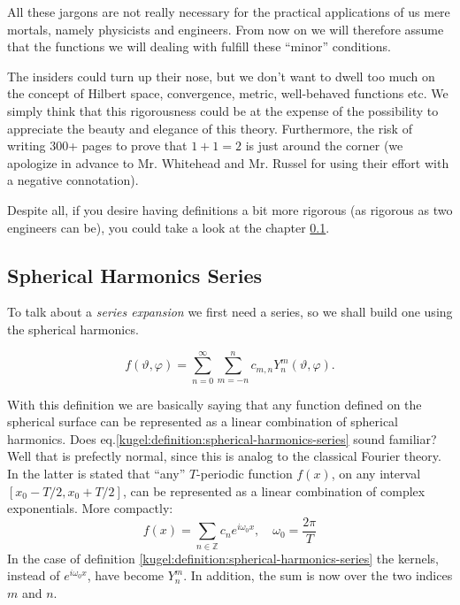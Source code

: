 All these jargons are not really necessary for the practical applications of us mere mortals, namely physicists and engineers. 
From now on we will therefore assume that the functions we will dealing with fulfill these ``minor'' conditions.

The insiders could turn up their nose, but we don't want to dwell too much on the concept of Hilbert space, convergence, metric, well-behaved functions etc.
We simply think that this rigorousness could be at the expense of the possibility to appreciate the beauty and elegance of this theory. 
Furthermore, the risk of writing 300+ pages to prove that $1+1=2$\cite{principia-mathematica} is just around the corner (we apologize in advance to Mr. Whitehead and Mr. Russel for using their effort with a negative connotation). 

Despite all, if you desire having definitions a bit more rigorous (as rigorous as two engineers can be), you could take a look at the chapter \ref{}.

\subsection{Spherical Harmonics Series}

To talk about a \emph{series expansion} we first need a series, so we shall
build one using the spherical harmonics.

\begin{definition}
  \label{kugel:definition:spherical-harmonics-series}
  \begin{equation}
    f(\vartheta, \varphi) 
    = \sum_{n=0}^\infty \sum_{m =-n}^n
      c_{m,n} Y^m_n(\vartheta, \varphi). \label{kugel:definition:spherical-harmonics-series}
  \end{equation}
\end{definition}

With this definition we are basically saying that any function defined on the spherical surface can be represented as a linear combination of spherical harmonics. 
Does eq.\eqref{kugel:definition:spherical-harmonics-series} sound familiar? Well that is prefectly normal, since this is analog to the classical Fourier theory. 
In the latter is stated that ``any'' $T$-periodic function $f(x)$, on any interval $[x_0-T/2,x_0+T/2]$, can be represented as a linear combination of complex exponentials. More compactly:
\begin{equation*}
  f(x) = \sum_{n \in \mathbb{Z}} c_n e^{i \omega_0 x}, \quad \omega_0=\frac{2\pi}{T}
\end{equation*}
In the case of definition \ref{kugel:definition:spherical-harmonics-series} the kernels, instead of $e^{i\omega_0x}$, have become $Y^m_n$. In addition, the sum is now over the two indices $m$ and $n$.

